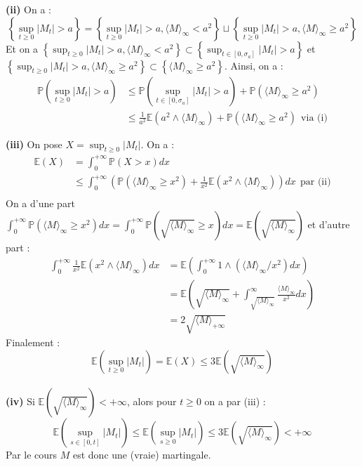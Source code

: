 \documentclass[a4paper,12pt]{article}
\newcommand{\E}{\mathbb{E}}
\newcommand{\prob}{\mathbb{P}}
\begin{document}
\textbf{(ii)} On a :
$$\left\{ \sup_{t \geq 0} |M_t| > a \right\} = \left\{ \sup_{t \geq 0} |M_t| > a , \langle M \rangle_{\infty} < a^2\right\} \sqcup \left\{ \sup_{t \geq 0} |M_t| > a  , \langle M \rangle_{\infty} \geq a^2 \right\} $$
Et on a $\left\{ \sup_{t \geq 0} |M_t| > a , \langle M \rangle_{\infty} < a^2 \right\} \subset \left\{ \sup_{t \in [0, \sigma_a]} |M_t| > a \right\}$ et $\left\{ \sup_{t \geq 0} |M_t| > a  , \langle M \rangle_{\infty} \geq a^2 \right\} \subset \left\{ \langle M \rangle_{\infty} \geq a^2 \right\}$. Ainsi, on a :
\begin{align*}
\prob \left(\sup_{t \geq 0} |M_t| > a \right) & \leq \prob \left(\sup_{t \in [0, \sigma_a]} |M_t| > a \right) + \prob \left(\langle M \rangle_{\infty} \geq a^2 \right) \\
& \leq \frac{1}{a^2} \E (a^2 \wedge \langle M \rangle_{\infty}) + \prob (\langle M \rangle_{\infty} \geq a^2) \ \ \text{via (i)}
\end{align*}

\textbf{(iii)} On pose $X = \sup_{t \geq 0} |M_t|$. On a :
\begin{align*}
\E (X)  & = \int_{0}^{+ \infty} \prob (X > x) dx \\
& \leq \int_{0}^{+ \infty} \left( \prob (\langle M \rangle_{\infty} \geq x^2 ) + \frac{1}{x^2} \E (x^2 \wedge \langle M \rangle_{\infty}) \right) dx \ \ \text{par (ii)} \\
\end{align*}
On a d'une part $\int_{0}^{+ \infty} \prob (\langle M \rangle_{\infty} \geq x^2) dx = \int_{0}^{+\infty} \prob (\sqrt{\langle M \rangle_{\infty}} \geq x) dx = \E (\sqrt{\langle M \rangle_{\infty}})$ et d'autre part :
\begin{align*}
\int_{0}^{+ \infty} \frac{1}{x^2} \E (x^2 \wedge \langle M \rangle_{\infty}) dx & = \E \left( \int_{0}^{+ \infty} 1 \wedge ( \langle M \rangle_{\infty}/x^2) dx \right) \\
& = \E \left( \sqrt{\langle M \rangle_{\infty}} + \int_{\sqrt{\langle M \rangle_{\infty}}}^{\infty} \frac{\langle M \rangle_{\infty}}{x^2} dx \right) \\
& = 2 \sqrt{\langle M \rangle_{+\infty}}
\end{align*}
Finalement :
$$\E \left( \sup_{t \geq 0} |M_t| \right) = \E(X) \leq 3 \E (\sqrt{\langle M \rangle_{\infty}}) $$ \\

\textbf{(iv)} Si $\E (\sqrt{\langle M \rangle_{\infty}}) < + \infty$, alors pour $t \geq 0$ on a par (iii) :
$$\E \left( \sup_{s \in [0,t]} |M_t| \right ) \leq \E \left( \sup_{s \geq 0} |M_t| \right ) \leq 3 \E (\sqrt{\langle M \rangle_{\infty}}) < + \infty$$
Par le cours $M$ est donc une (vraie) martingale. \\
\end{document}
